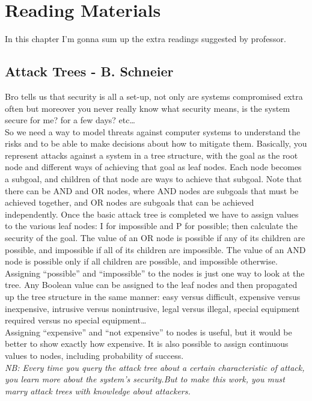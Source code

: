 \chapter{Reading Materials}
In this chapter I'm gonna sum up the extra readings suggested by professor.
\section{Attack Trees - B. Schneier}\label{section:AttackTrees}
Bro tells us that security is all a set-up, not only are systems compromised extra often but moreover you never really know what security means, is the system secure for me? for a few days? etc\dots
\\
So we need a way to model threats against computer systems to understand the risks and to be able to make decisions about how to mitigate them.
Basically, you represent attacks against a system in a tree structure, with the goal as the root node and different ways of achieving that goal as leaf nodes.
Each node becomes a subgoal, and children of that node are ways to achieve that subgoal.
Note that there can be AND and OR nodes, where AND nodes are subgoals that must be achieved together, and OR nodes are subgoals that can be achieved independently.
Once the basic attack tree is completed we have to assign values to the various leaf nodes: I for impossible and P for possible; then calculate the security of the goal. The value of an OR node is
possible if any of its children are possible, and impossible if all of its children are impossible. The value of an AND node is possible only if all children are possible, and impossible otherwise.
\\Assigning “possible” and “impossible” to the nodes is just one way to look at the tree. Any Boolean
value can be assigned to the leaf nodes and then propagated up the tree structure in the same
manner: easy versus difficult, expensive versus inexpensive, intrusive versus nonintrusive, legal versus illegal, special equipment required versus no special equipment\dots
\\Assigning “expensive” and “not expensive” to nodes is useful, but it would be better to show exactly
how expensive. It is also possible to assign continuous values to nodes, including probability of success.
\\\textit{NB: Every time you query the attack tree about a certain characteristic of attack, you learn
more about the system’s security.But to make this work, you must marry attack trees with knowledge about attackers.}
